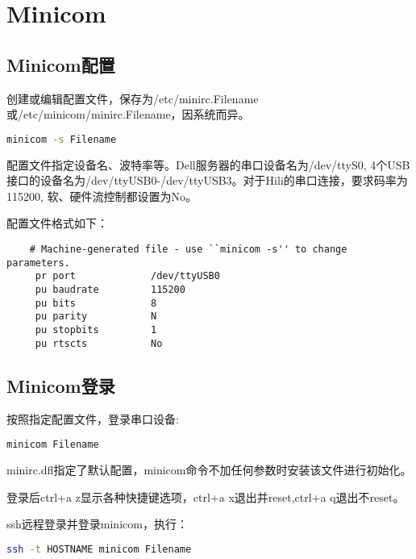 \section{Minicom}

\subsection{Minicom配置}

创建或编辑配置文件，保存为/etc/minirc.Filename或/etc/minicom/minirc.Filename，因系统而异。
\begin{lstlisting}[language=bash]
minicom -s Filename
\end{lstlisting}
配置文件指定设备名、波特率等。Dell服务器的串口设备名为/dev/ttyS0, 4个USB接口的设备名为/dev/ttyUSB0-/dev/ttyUSB3。对于Hili的串口连接，要求码率为115200, 软、硬件流控制都设置为No。

配置文件格式如下：
\begin{lstlisting}
    # Machine-generated file - use ``minicom -s'' to change parameters. 
     pr port             /dev/ttyUSB0 
     pu baudrate         115200 
     pu bits             8 
     pu parity           N 
     pu stopbits         1 
     pu rtscts           No
\end{lstlisting}

\subsection{Minicom登录}
按照指定配置文件，登录串口设备:
\begin{lstlisting}[language=bash]
minicom Filename
\end{lstlisting}

minirc.dfl指定了默认配置，minicom命令不加任何参数时安装该文件进行初始化。

登录后ctrl+a z显示各种快捷键选项，ctrl+a x退出并reset,ctrl+a q退出不reset。

ssh远程登录并登录minicom，执行：
\begin{lstlisting}[language=bash]
ssh -t HOSTNAME minicom Filename
\end{lstlisting}
\label{sshMinicom}

